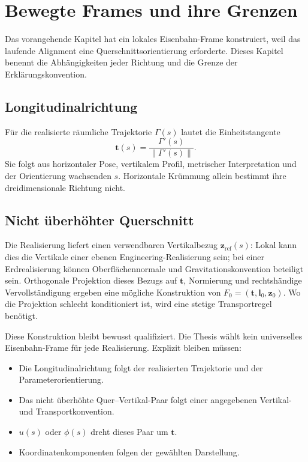 \chapter{Bewegte Frames und ihre Grenzen}

Das vorangehende Kapitel hat ein lokales Eisenbahn-Frame konstruiert, weil das
laufende Alignment eine Querschnittsorientierung erforderte. Dieses Kapitel
benennt die Abhängigkeiten jeder Richtung und die Grenze der
Erklärungskonvention.

\section{Longitudinalrichtung}

Für die realisierte räumliche Trajektorie \(\Gamma(s)\) lautet die
Einheitstangente
\[
\mathbf t(s)=\frac{\Gamma'(s)}{\|\Gamma'(s)\|}.
\]
Sie folgt aus horizontaler Pose, vertikalem Profil, metrischer Interpretation
und der Orientierung wachsenden \(s\). Horizontale Krümmung allein bestimmt
ihre dreidimensionale Richtung nicht.

\section{Nicht überhöhter Querschnitt}

Die Realisierung liefert einen verwendbaren Vertikalbezug
\(\mathbf z_{\mathrm{ref}}(s)\): Lokal kann dies die Vertikale einer ebenen
Engineering-Realisierung sein; bei einer Erdrealisierung können
Oberflächennormale und Gravitationskonvention beteiligt sein. Orthogonale
Projektion dieses Bezugs auf \(\mathbf t\), Normierung und rechtshändige
Vervollständigung ergeben eine mögliche Konstruktion von
\(F_0=(\mathbf t,\mathbf l_0,\mathbf z_0)\). Wo die Projektion schlecht
konditioniert ist, wird eine stetige Transportregel benötigt.

Diese Konstruktion bleibt bewusst qualifiziert. Die Thesis wählt kein
universelles Eisenbahn-Frame für jede Realisierung. Explizit bleiben müssen:
\begin{itemize}
\item Die Longitudinalrichtung folgt der realisierten Trajektorie und der
  Parameterorientierung.
\item Das nicht überhöhte Quer--Vertikal-Paar folgt einer angegebenen
  Vertikal- und Transportkonvention.
\item \(u(s)\) oder \(\phi(s)\) dreht dieses Paar um \(\mathbf t\).
\item Koordinatenkomponenten folgen der gewählten Darstellung.
\end{itemize}

